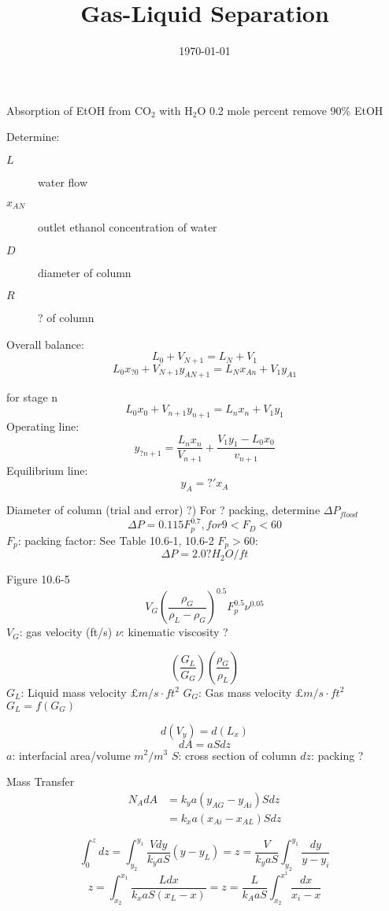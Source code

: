 \documentclass[11pt]{article}
\begin{document}
\title{Gas-Liquid Separation}
\date{\today}
\maketitle

Absorption of EtOH from CO$_2$ with H$_2$O
0.2 mole percent remove 90\% EtOH

Determine:
\begin{description}
\item[$L$] water flow
\item[$x_{AN}$] outlet ethanol concentration of water
\item[$D$] diameter of column
\item[$R$] ? of column
\end{description}

Overall balance:
\[L_0 + V_{N+1} = L_N+V_1\]
\[L_0 x_{?0} + V_{N+1} y_{AN+1} = L_N x_{An} + V_1 y_{A1}\]

for stage n
\[L_0 x_0 + V_{n+1} y_{n+1} = L_n x_n + V_1 y_1\]
Operating line:
\[y_{?n+1} = \frac{L_n x_n}{V_{n+1}} + \frac{V_1 y_1 - L_0 x_0}{v_{n+1}}\]
Equilibrium line:
\[y_A = ?'x_A\]

Diameter of column (trial and error)
?) For ? packing, determine $\Delta P_{flood}$
\[\Delta P = 0.115 F_p^{0.7}, for 9<F_D<60\]
$F_p$: packing factor: See Table 10.6-1, 10.6-2
$F_p>60$:
\[\Delta P = 2.0? H_2O/ft\]

Figure 10.6-5
\[V_G \left(\frac{\rho_G}{\rho_L-\rho_G}\right)^{0.5} F_p^{0.5} \nu^{0.05}\]
$V_G$: gas velocity (ft/s)
$\nu$: kinematic viscosity ?

\[\left(\frac{G_L}{G_G}\right)\left(\frac{\rho_G}{\rho_L}\right)\]
$G_L$: Liquid mass velocity $\pounds m/s\cdot ft^2$
$G_G$: Gas mass velocity $\pounds m/s\cdot ft^2$
$G_L = f(G_G)$

\[d(V_y) = d(L_x)\]
\[dA = aSdz\]
$a$: interfacial area/volume $m^2/m^3$
$S$: cross section of column
$dz$: packing ?

Mass Transfer
\begin{align}
N_A dA &= k_y a (y_{AG}-y_{Ai})Sdz\\
&=k_x a (x_{Ai}-x_{AL}) S dz
\end{align}

\[\int_0^z dz = \int_{y_2}^{y_1} \frac{Vdy}{k_y a S}
(y-y_L) = z = \frac{V}{k_y a S} \int_{y_2}^{y_1} \frac{dy}{y-y_i}\]
\[z = \int_{x_2}^{x_1} \frac{L dx}{k_x a S (x_L - x)} = z
= \frac{L}{k_A a S} \int_{x_2}^{x^1} \frac{dx}{x_i-x}\]
\end{document}
